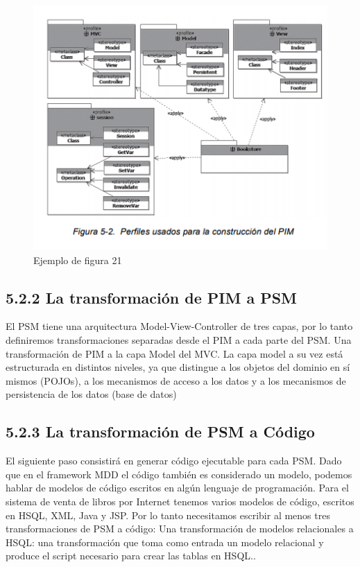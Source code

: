 \begin{figure}[H]
\centering
\includegraphics[scale=0.9]{./Imagenes/modelo21}
\caption{Ejemplo de figura 21}
\label{figura21}
\end{figure}

\subsection{5.2.2 La transformación de PIM a PSM }

El PSM tiene una arquitectura Model-View-Controller de tres capas, por lo tanto definiremos transformaciones separadas desde el PIM a cada parte del PSM.
Una transformación de PIM a la capa Model del MVC. La capa model a su vez está estructurada en distintos niveles, ya que distingue a los objetos del dominio en sí mismos (POJOs), a los mecanismos de acceso a los datos y a los mecanismos de persistencia de los datos (base de datos)

\subsection{5.2.3 La transformación de PSM a Código}

El siguiente paso consistirá en generar código ejecutable para cada PSM. Dado que en el framework MDD el código también es considerado un modelo, podemos hablar de modelos de código escritos en algún lenguaje de programación. Para el sistema de venta de libros por Internet tenemos varios modelos de código, escritos en HSQL, XML, Java y JSP. Por lo tanto necesitamos escribir al menos tres transformaciones de PSM a código: Una transformación de modelos relacionales a HSQL: una transformación que toma como entrada un modelo relacional y produce el script necesario para crear las tablas en HSQL..


